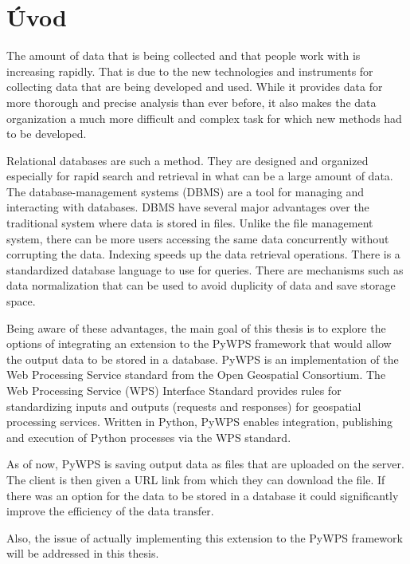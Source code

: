 \chapter{Úvod}
\label{1-uvod}

The amount of data that is being collected and that people work with is increasing rapidly. That is due to the new technologies and instruments for collecting data that are being developed and used. While it provides data for more thorough and precise analysis than ever before, it also makes the data organization a much more difficult and complex task for which new methods had to be developed.

Relational databases are such a method. They are designed and organized especially for rapid search and retrieval in what can be a large amount of data. The database-management systems (DBMS) are a tool for managing and interacting with databases. DBMS have several major advantages over the traditional system where data is stored in files. Unlike the file management system, there can be more users accessing the same data concurrently without corrupting the data. Indexing speeds up the data retrieval operations. There is a standardized database language to use for queries. There are mechanisms such as data normalization that can be used to avoid duplicity of data and save storage space.
	
Being aware of these advantages, the main goal of this thesis is to explore the options of integrating an extension to the PyWPS framework that would allow the output data to be stored in a database. PyWPS is an implementation of the Web Processing Service standard from the Open Geospatial Consortium. The Web Processing Service (WPS) Interface Standard provides rules for standardizing inputs and outputs (requests and responses) for geospatial processing services. Written in Python, PyWPS enables integration, publishing and execution of Python processes via the WPS standard.
	
As of now, PyWPS is saving output data as files that are uploaded on the server. The client is then given a URL link from which they can download the file. If there was an option for the data to be stored in a database it could significantly improve the efficiency of the data transfer. 
 
Also, the issue of actually implementing this extension to the PyWPS framework will be addressed in this thesis.
